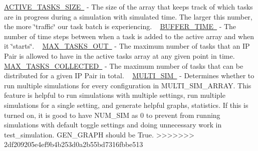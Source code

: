  \mbox{\hyperlink{}{A\+C\+T\+I\+V\+E\+\_\+\+T\+A\+S\+K\+S\+\_\+\+S\+I\+ZE }} -\/ The size of the array that keeps track of which tasks are in progress during a simulation with simulated time. The larger this number, the more \char`\"{}traffic\char`\"{} our task batch is experiencing. ~\newline
 \mbox{\hyperlink{}{B\+U\+F\+F\+E\+R\+\_\+\+T\+I\+ME }} -\/ The number of time steps between when a task is added to the active array and when it \char`\"{}starts\char`\"{}. ~\newline
 \mbox{\hyperlink{}{M\+A\+X\+\_\+\+T\+A\+S\+K\+S\+\_\+\+O\+UT }} -\/ The maximum number of tasks that an IP Pair is allowed to have in the active tasks array at any given point in time. ~\newline
 \mbox{\hyperlink{}{M\+A\+X\+\_\+\+T\+A\+S\+K\+S\+\_\+\+C\+O\+L\+L\+E\+C\+T\+ED }} -\/ The maximum number of tasks that can be distributed for a given IP Pair in total. ~\newline
 \mbox{\hyperlink{}{M\+U\+L\+T\+I\+\_\+\+S\+IM }} -\/ Determines whether to run multiple simulations for every configuration in M\+U\+L\+T\+I\+\_\+\+S\+I\+M\+\_\+\+A\+R\+R\+AY. This feature is helpful to run simulations with multiple settings, run multiple simulations for a single setting, and generate helpful graphs, statistics. If this is turned on, it is good to have N\+U\+M\+\_\+\+S\+IM as 0 to prevent from running simulations with default toggle settings and doing unnecessary work in test\+\_\+simulation. G\+E\+N\+\_\+\+G\+R\+A\+PH should be True.
>>>>>>> 2df209205e4ef9b4b253d0a2b55bd7316fbbe513

